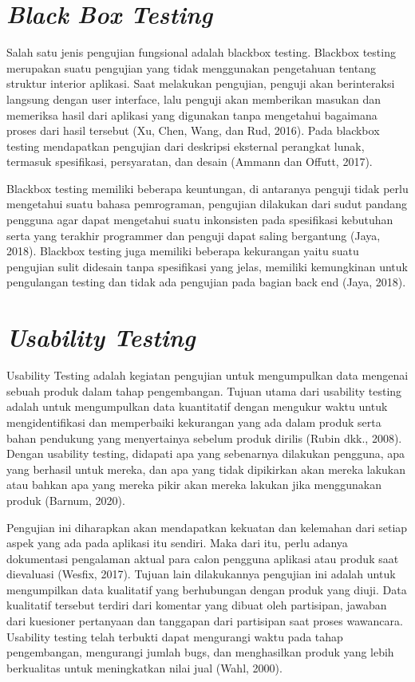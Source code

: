 \section{\textit{Black Box Testing}}
Salah satu jenis pengujian fungsional adalah blackbox testing. Blackbox testing merupakan suatu pengujian yang tidak menggunakan pengetahuan tentang struktur interior aplikasi. Saat melakukan pengujian, penguji akan berinteraksi langsung dengan user interface, lalu penguji akan memberikan masukan dan memeriksa hasil dari aplikasi yang digunakan tanpa mengetahui bagaimana proses dari hasil tersebut (Xu, Chen, Wang, dan Rud, 2016). Pada blackbox testing mendapatkan pengujian dari deskripsi eksternal perangkat lunak, termasuk spesifikasi, persyaratan, dan desain (Ammann dan Offutt, 2017).

\par Blackbox testing memiliki beberapa keuntungan, di antaranya penguji tidak perlu mengetahui suatu bahasa pemrograman, pengujian dilakukan dari sudut pandang pengguna agar dapat mengetahui suatu inkonsisten pada spesifikasi kebutuhan serta yang terakhir programmer dan penguji dapat saling bergantung (Jaya, 2018). Blackbox testing juga memiliki beberapa kekurangan yaitu suatu pengujian sulit didesain tanpa spesifikasi yang jelas, memiliki kemungkinan untuk pengulangan testing dan tidak ada pengujian pada bagian back end (Jaya, 2018).

\section{\textit{Usability Testing}}
Usability Testing adalah kegiatan pengujian untuk mengumpulkan data mengenai sebuah produk dalam tahap pengembangan. Tujuan utama dari usability testing adalah untuk mengumpulkan data kuantitatif dengan mengukur waktu untuk mengidentifikasi dan memperbaiki kekurangan yang ada dalam produk serta bahan pendukung yang menyertainya sebelum produk dirilis (Rubin dkk., 2008). Dengan usability testing, didapati apa yang sebenarnya dilakukan pengguna, apa yang berhasil untuk mereka, dan apa yang tidak dipikirkan akan mereka lakukan atau bahkan apa yang mereka pikir akan mereka lakukan jika menggunakan produk (Barnum, 2020).


\par Pengujian ini diharapkan akan mendapatkan kekuatan dan kelemahan dari setiap aspek yang ada pada aplikasi itu sendiri. Maka dari itu, perlu adanya dokumentasi pengalaman aktual para calon pengguna aplikasi atau produk saat dievaluasi (Wesfix, 2017). Tujuan lain dilakukannya pengujian ini adalah untuk mengumpilkan data kualitatif yang berhubungan dengan produk yang diuji. Data kualitatif tersebut terdiri dari komentar yang dibuat oleh partisipan, jawaban dari kuesioner pertanyaan dan tanggapan dari partisipan saat proses wawancara. Usability testing telah terbukti dapat mengurangi waktu pada tahap pengembangan, mengurangi jumlah bugs, dan menghasilkan produk yang lebih berkualitas untuk meningkatkan nilai jual (Wahl, 2000).


